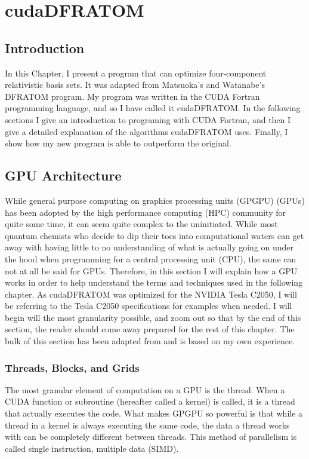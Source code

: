 \chapter{cudaDFRATOM}
\label{chp:cuda_dfratom}
\section{Introduction}
In this Chapter, I present a program that can optimize four-component relativistic basis sets. It was adapted from Matsuoka's and Watanabe's DFRATOM program\cite{MATSUOKA2001218}. My program was written in the CUDA Fortran programming language\cite{cudaFortran_pgi}, and so I have called it cudaDFRATOM. In the following sections I give an introduction to programing with CUDA Fortran, and then I give a detailed explanation of the algorithms cudaDFRATOM uses. Finally, I show how my new program is able to outperform the original.

\section{GPU Architecture}
While general purpose computing on graphics processing units (GPGPU) (GPUs) has been adopted by the high performance computing (HPC) community for quite some time, it can seem quite complex to the uninitiated. While most quantum chemists who decide to dip their toes into computational waters can get away with having little to no understanding of what is actually going on under the hood when programming for a central processing unit (CPU), the same can not at all be said for GPUs. Therefore, in this section I will explain how a GPU works in order to help understand the terms and techniques used in the following chapter. As cudaDFRATOM was optimized for the NVIDIA Tesla C2050, I will be referring to the Tesla C2050 specifications for examples when needed. I will begin will the most granularity possible, and zoom out so that by the end of this section, the reader should come away prepared for the rest of this chapter. The bulk of this section has been adapted from \cite{Ruetsch:2013:CFS:2588277, cudaFortran_pgi} and is based on my own experience.

\subsection{Threads, Blocks, and Grids}
\label{ThBlGr}
The most granular element of computation on a GPU is the thread. When a CUDA function or subroutine (hereafter called a kernel) is called, it is a thread that actually executes the code. What makes GPGPU so powerful is that while a thread in a kernel is always executing the same code, the data a thread works with can be completely different between threads. This method of parallelism is called single instruction, multiple data (SIMD). 

